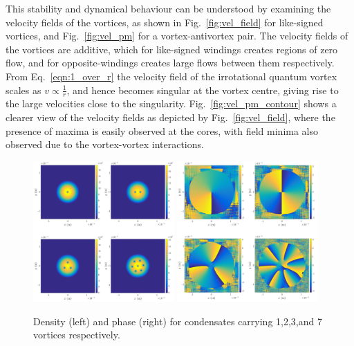 This stability and dynamical behaviour can be understood by examining the velocity fields of the vortices, as shown in Fig.~\ref{fig:vel_field} for like-signed vortices, and Fig.~\ref{fig:vel_pm} for a vortex-antivortex pair. The velocity fields of the vortices are additive, which for like-signed windings creates regions of zero flow, and for opposite-windings creates large flows between them respectively. From Eq.~\ref{eqn:1_over_r} the velocity field of the irrotational quantum vortex scales as $v \propto \frac{1}{r}$, and hence becomes singular at the vortex centre, giving rise to the large velocities close to the singularity. Fig.~\ref{fig:vel_pm_contour} shows a clearer view of the velocity fields as depicted by Fig.~\ref{fig:vel_field}, where the presence of maxima is easily observed at the cores, with field minima also observed due to the vortex-vortex interactions.

\begin{figure}\centering
    \includegraphics[width=0.48\textwidth]{Images/ch4_vtx/fewvortex_rho.pdf}
    \includegraphics[width=0.48\textwidth]{Images/ch4_vtx/fewvortex_theta.pdf}
    \caption{Density (left) and phase (right) for condensates carrying 1,2,3,and 7 vortices respectively.}
    \label{fig:few_rho}
\end{figure}

